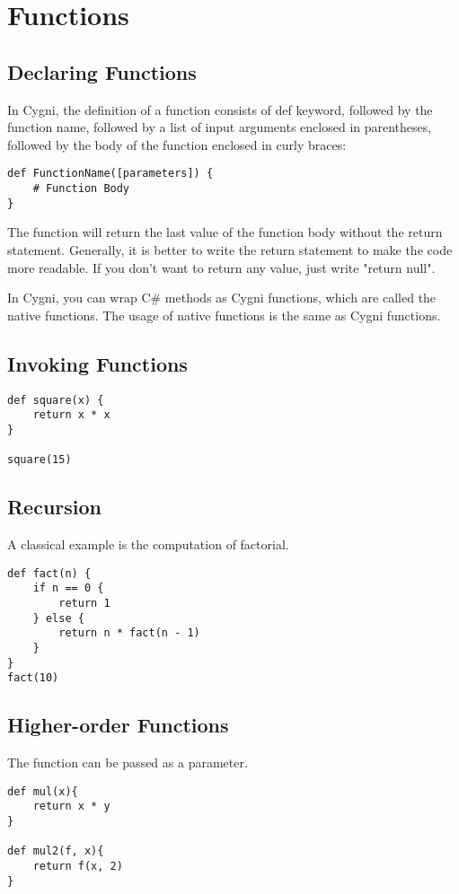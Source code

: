 \chapter{Functions}
\section{Declaring Functions}
In Cygni, the definition of a function consists of def keyword, 
followed by the function name, 
followed by a list of input arguments enclosed in parentheses, 
followed by the body of the function enclosed in curly braces:

\begin{lstlisting}
def FunctionName([parameters]) {
	# Function Body
}
\end{lstlisting}
The function will return the last value of the function body without the return statement. Generally, it is better to write the return statement to make the code more readable. If you don't want to return any value, just write "return null".

In Cygni, you can wrap C\# methods as Cygni functions, which are called the native functions. The usage of native functions is the same as Cygni functions.
\section{Invoking Functions}
\begin{lstlisting}
def square(x) {
	return x * x
}

square(15)
\end{lstlisting}

\section{Recursion}
A classical example is the computation of factorial.
\begin{lstlisting}
def fact(n) {
	if n == 0 {
		return 1
	} else {
		return n * fact(n - 1)
	}
}
fact(10)
\end{lstlisting}
\section{Higher-order Functions}
The function can be passed as a parameter. 
\begin{lstlisting}
def mul(x){
	return x * y
}

def mul2(f, x){
	return f(x, 2)
}
\end{lstlisting}


